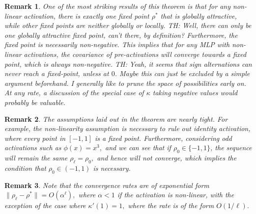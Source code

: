 \documentclass[twoside]{article}
\newtheorem{remark}{Remark}
\theoremstyle{definition}
\newcommand{\thomas}[1]{{\color{blue}TH:  \textit{#1}}}
\begin{document}
\begin{remark}
One of the most striking results of this theorem is that for any non-linear activation, there is exactly one fixed point $\rho^*$ that is globally attractive, while other fixed points are neither globally or locally. \thomas{Well, there can only be one globally attractive fixed point, can't there, by definition?} Furthermore, the fixed point is necessarily non-negative. This implies that for any MLP with non-linear activations, the covariance of pre-activations will converge towards a fixed point, which is always non-negative. 
\thomas{Yeah, it seems that sign alternations can never reach a fixed-point, unless at $0$. Maybe this can just be excluded by a simple argument beforehand. I generally like to prune the space of possibilities early on. At any rate, a discussion of the special case of $\kappa$ taking negative values would probably be valuable.}
\end{remark}

\begin{remark}
The assumptions laid out in the theorem are nearly tight. For example, the non-linearity assumption is necessary to rule out identity activation, where every point in $[-1,1]$ is a fixed point. Furthermore, considering odd activations such as $\phi(x) = x^3,$ and we can see that if $\rho_0\in\{-1,1\}$, the sequence will remain the same $\rho_\ell=\rho_0,$ and hence will not converge, which implies the condition that $\rho_0\in(-1,1)$ is necessary. 
\end{remark}

\begin{remark}
Note that the convergence rates are of exponential form $\|\rho_\ell-\rho^*\|= O(\alpha^\ell),$ where $\alpha<1$ if the activation is non-linear, with the exception of the case where $\kappa'(1)=1,$ where the rate is of the form $O(1/\ell).$ 
\end{remark}
\end{document}
